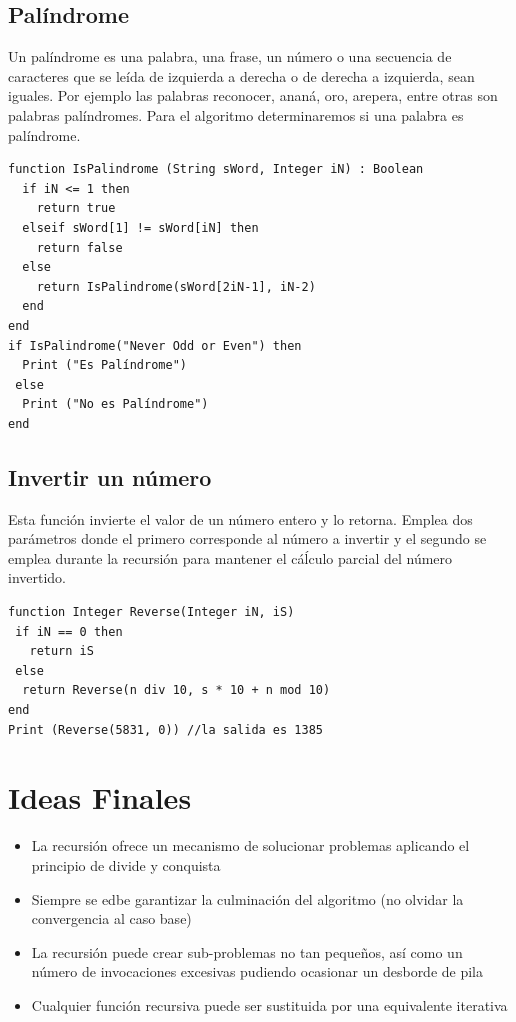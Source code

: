 \subsection{Palíndrome}

Un palíndrome es una palabra, una frase, un número o una secuencia de caracteres que se leída de izquierda a derecha o de derecha a izquierda, sean iguales. Por ejemplo las palabras reconocer, ananá, oro, arepera, entre otras son palabras palíndromes. Para el algoritmo determinaremos si una palabra es palíndrome.

\begin{lstlisting}[upquote=true, language=pseudo]
function IsPalindrome (String sWord, Integer iN) : Boolean
  if iN <= 1 then 
    return true
  elseif sWord[1] != sWord[iN] then
    return false
  else
    return IsPalindrome(sWord[2iN-1], iN-2)
  end
end
if IsPalindrome("Never Odd or Even") then
  Print ("Es Palíndrome")
 else
  Print ("No es Palíndrome")
end
\end{lstlisting}

\subsection{Invertir un número}

Esta función invierte el valor de un número entero y lo retorna. Emplea dos parámetros donde el primero corresponde al número a invertir y el segundo se emplea durante la recursión para mantener el cáĺculo parcial del número invertido.

\begin{lstlisting}[upquote=true, language=pseudo]
function Integer Reverse(Integer iN, iS)
 if iN == 0 then
   return iS
 else
  return Reverse(n div 10, s * 10 + n mod 10)
end
Print (Reverse(5831, 0)) //la salida es 1385
\end{lstlisting}

\section{Ideas Finales}

\begin{itemize}
\item La recursión ofrece un mecanismo de solucionar problemas aplicando el principio de divide y conquista
\item Siempre se edbe garantizar la culminación del algoritmo (no olvidar la convergencia al caso base)
\item La recursión puede crear sub-problemas no tan pequeños, así como un número de invocaciones excesivas pudiendo ocasionar un desborde de pila
\item Cualquier función recursiva puede ser sustituida por una equivalente iterativa
\end{itemize}

